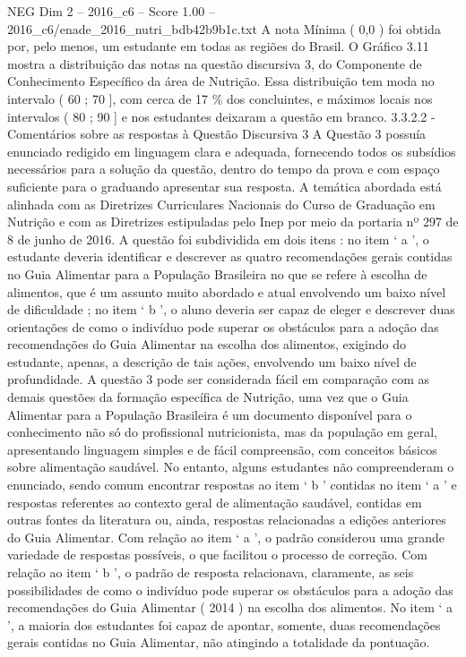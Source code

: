 \begin{textsample}{NEG Dim 2 – 2016\_c6 – Score 1.00 – 2016\_c6/enade\_2016\_nutri\_bdb42b9b1c.txt}
A nota Mínima ( 0,0 ) foi obtida por, pelo menos, um estudante em todas as regiões do Brasil.
O Gráfico 3.11 mostra a distribuição das notas na questão discursiva 3, do Componente de Conhecimento Específico da área de Nutrição.
Essa distribuição tem moda no intervalo ( 60 ; 70 ], com cerca de 17 \% dos concluintes, e máximos locais nos intervalos ( 80 ; 90 ] e nos estudantes deixaram a questão em branco. 3.3.2.2 - Comentários sobre as respostas à Questão Discursiva 3 A Questão 3 possuía enunciado redigido em linguagem clara e adequada, fornecendo todos os subsídios necessários para a solução da questão, dentro do tempo da prova e com espaço suficiente para o graduando apresentar sua resposta.
A temática abordada está alinhada com as Diretrizes Curriculares Nacionais do Curso de Graduação em Nutrição e com as Diretrizes estipuladas pelo Inep por meio da portaria nº 297 de 8 de junho de 2016.
A questão foi subdividida em dois itens : no item ‘ a ’, o estudante deveria identificar e descrever as quatro recomendações gerais contidas no Guia Alimentar para a População Brasileira no que se refere à escolha de alimentos, que é um assunto muito abordado e atual envolvendo um baixo nível de dificuldade ; no item ‘ b ’, o aluno deveria ser capaz de eleger e descrever duas orientações de como o indivíduo pode superar os obstáculos para a adoção das recomendações do Guia Alimentar na escolha dos alimentos, exigindo do estudante, apenas, a descrição de tais ações, envolvendo um baixo nível de profundidade.
A questão 3 pode ser considerada fácil em comparação com as demais questões da formação específica de Nutrição, uma vez que o Guia Alimentar para a População Brasileira é um documento disponível para o conhecimento não só do profissional nutricionista, mas da população em geral, apresentando linguagem simples e de fácil compreensão, com conceitos básicos sobre alimentação saudável.
No entanto, alguns estudantes não compreenderam o enunciado, sendo comum encontrar respostas ao item ‘ b ’ contidas no item ‘ a ’ e respostas referentes ao contexto geral de alimentação saudável, contidas em outras fontes da literatura ou, ainda, respostas relacionadas a edições anteriores do Guia Alimentar.
Com relação ao item ‘ a ’, o padrão considerou uma grande variedade de respostas possíveis, o que facilitou o processo de correção.
Com relação ao item ‘ b ’, o padrão de resposta relacionava, claramente, as seis possibilidades de como o indivíduo pode superar os obstáculos para a adoção das recomendações do Guia Alimentar ( 2014 ) na escolha dos alimentos.
No item ‘ a ’, a maioria dos estudantes foi capaz de apontar, somente, duas recomendações gerais contidas no Guia Alimentar, não atingindo a totalidade da pontuação.

\end{textsample}
